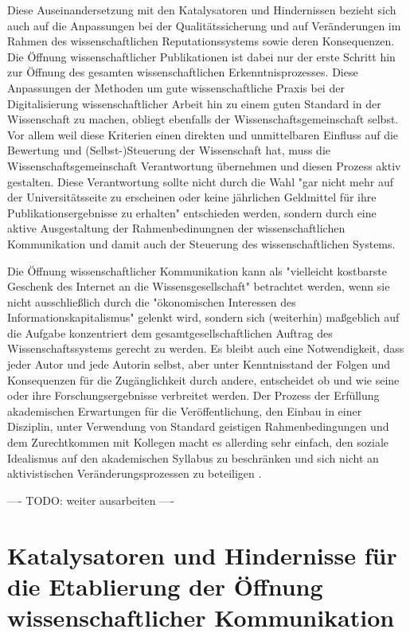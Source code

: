 Diese Auseinandersetzung mit den Katalysatoren und Hindernissen bezieht sich auch auf die Anpassungen bei der Qualitätssicherung und auf Veränderungen im Rahmen des wissenschaftlichen Reputationssystems sowie deren Konsequenzen. Die Öffnung wissenschaftlicher Publikationen ist dabei nur der erste Schritt hin zur Öffnung des gesamten wissenschaftlichen Erkenntnisprozesses. Diese Anpassungen der Methoden um gute wissenschaftliche Praxis bei der Digitalisierung wissenschaftlicher Arbeit hin zu einem guten Standard in der Wissenschaft zu machen, obliegt ebenfalls der Wissenschaftsgemeinschaft selbst. Vor allem weil diese Kriterien einen direkten und unmittelbaren Einfluss auf die Bewertung und (Selbst-)Steuerung der Wissenschaft hat, muss die Wissenschaftsgemeinschaft Verantwortung übernehmen und diesen Prozess aktiv gestalten. Diese Verantwortung sollte nicht durch die Wahl "gar nicht mehr auf der Universitätsseite zu erscheinen oder keine jährlichen Geldmittel für ihre Publikationsergebnisse zu erhalten" \cite{Warnke_2012} entschieden werden, sondern durch eine aktive Ausgestaltung der Rahmenbedinungnen der wissenschaftlichen Kommunikation und damit auch der Steuerung des wissenschaftlichen Systems.

Die Öffnung wissenschaftlicher Kommunikation kann als "vielleicht kostbarste Geschenk des Internet an die Wissensgesellschaft" betrachtet werden, wenn sie nicht ausschließlich durch die "ökonomischen Interessen des Informationskapitalismus" \cite{hagner_2015_sache_buches} gelenkt wird, sondern sich (weiterhin) maßgeblich auf die Aufgabe konzentriert dem gesamtgesellschaftlichen Auftrag des Wissenschaftssystems gerecht zu werden. Es bleibt auch eine Notwendigkeit, dass jeder Autor und jede Autorin selbst, aber unter Kenntnisstand der Folgen und Konsequenzen für die Zugänglichkeit durch andere, entscheidet ob und wie seine oder ihre Forschungsergebnisse verbreitet werden. Der Prozess der Erfüllung akademischen Erwartungen für die Veröffentlichung, den Einbau in einer Disziplin, unter Verwendung von Standard geistigen Rahmenbedingungen und dem Zurechtkommen mit Kollegen macht es allerding sehr einfach, den soziale Idealismus auf den akademischen Syllabus zu beschränken und sich nicht an aktivistischen Veränderungsprozessen zu beteiligen \cite[:25]{flood_2013_combining}.

---- TODO: weiter ausarbeiten ----

\section{Katalysatoren und Hindernisse für die Etablierung der Öffnung wissenschaftlicher Kommunikation}

